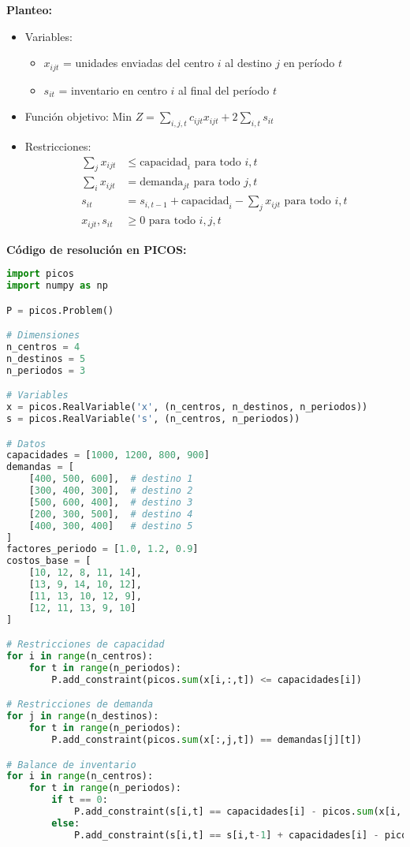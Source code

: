 \documentclass[12pt]{article}
\begin{document}
\begin{enumerate}
\textbf{Planteo:}
\begin{itemize}
\item Variables:
  \begin{itemize}
  \item $x_{ijt}$ = unidades enviadas del centro $i$ al destino $j$ en período $t$
  \item $s_{it}$ = inventario en centro $i$ al final del período $t$
  \end{itemize}
\item Función objetivo: Min $Z = \sum_{i,j,t} c_{ijt}x_{ijt} + 2\sum_{i,t} s_{it}$
\item Restricciones:
  \begin{align*}
  \sum_j x_{ijt} &\leq \text{capacidad}_i \text{ para todo } i,t \\
  \sum_i x_{ijt} &= \text{demanda}_{jt} \text{ para todo } j,t \\
  s_{it} &= s_{i,t-1} + \text{capacidad}_i - \sum_j x_{ijt} \text{ para todo } i,t \\
  x_{ijt}, s_{it} &\geq 0 \text{ para todo } i,j,t
  \end{align*}
\end{itemize}

\textbf{Código de resolución en PICOS:}
\begin{lstlisting}[language=Python]
import picos
import numpy as np

P = picos.Problem()

# Dimensiones
n_centros = 4
n_destinos = 5
n_periodos = 3

# Variables
x = picos.RealVariable('x', (n_centros, n_destinos, n_periodos))
s = picos.RealVariable('s', (n_centros, n_periodos))

# Datos
capacidades = [1000, 1200, 800, 900]
demandas = [
    [400, 500, 600],  # destino 1
    [300, 400, 300],  # destino 2
    [500, 600, 400],  # destino 3
    [200, 300, 500],  # destino 4
    [400, 300, 400]   # destino 5
]
factores_periodo = [1.0, 1.2, 0.9]
costos_base = [
    [10, 12, 8, 11, 14],
    [13, 9, 14, 10, 12],
    [11, 13, 10, 12, 9],
    [12, 11, 13, 9, 10]
]

# Restricciones de capacidad
for i in range(n_centros):
    for t in range(n_periodos):
        P.add_constraint(picos.sum(x[i,:,t]) <= capacidades[i])

# Restricciones de demanda
for j in range(n_destinos):
    for t in range(n_periodos):
        P.add_constraint(picos.sum(x[:,j,t]) == demandas[j][t])

# Balance de inventario
for i in range(n_centros):
    for t in range(n_periodos):
        if t == 0:
            P.add_constraint(s[i,t] == capacidades[i] - picos.sum(x[i,:,t]))
        else:
            P.add_constraint(s[i,t] == s[i,t-1] + capacidades[i] - picos.sum(x[i,:,t]))


\end{lstlisting}
\end{enumerate}
\end{document}
